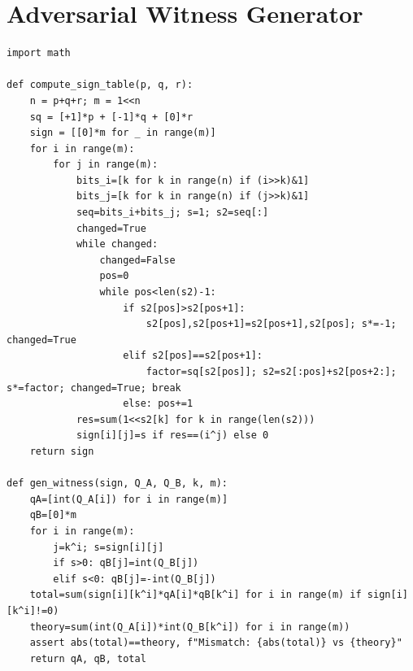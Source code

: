 \documentclass[11pt,a4paper]{article}
\theoremstyle{definition}
\theoremstyle{plain}
\theoremstyle{remark}
\begin{document}
\section{Adversarial Witness Generator}
\label{app:proof}
\begin{lstlisting}[caption={Python: generate tight-bound adversarial inputs},
  label=lst:witness]
import math

def compute_sign_table(p, q, r):
    n = p+q+r; m = 1<<n
    sq = [+1]*p + [-1]*q + [0]*r
    sign = [[0]*m for _ in range(m)]
    for i in range(m):
        for j in range(m):
            bits_i=[k for k in range(n) if (i>>k)&1]
            bits_j=[k for k in range(n) if (j>>k)&1]
            seq=bits_i+bits_j; s=1; s2=seq[:]
            changed=True
            while changed:
                changed=False
                pos=0
                while pos<len(s2)-1:
                    if s2[pos]>s2[pos+1]:
                        s2[pos],s2[pos+1]=s2[pos+1],s2[pos]; s*=-1; changed=True
                    elif s2[pos]==s2[pos+1]:
                        factor=sq[s2[pos]]; s2=s2[:pos]+s2[pos+2:]; s*=factor; changed=True; break
                    else: pos+=1
            res=sum(1<<s2[k] for k in range(len(s2)))
            sign[i][j]=s if res==(i^j) else 0
    return sign

def gen_witness(sign, Q_A, Q_B, k, m):
    qA=[int(Q_A[i]) for i in range(m)]
    qB=[0]*m
    for i in range(m):
        j=k^i; s=sign[i][j]
        if s>0: qB[j]=int(Q_B[j])
        elif s<0: qB[j]=-int(Q_B[j])
    total=sum(sign[i][k^i]*qA[i]*qB[k^i] for i in range(m) if sign[i][k^i]!=0)
    theory=sum(int(Q_A[i])*int(Q_B[k^i]) for i in range(m))
    assert abs(total)==theory, f"Mismatch: {abs(total)} vs {theory}"
    return qA, qB, total
\end{lstlisting}
\end{document}
